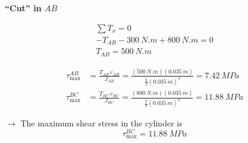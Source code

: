 \documentclass[11pt]{article}
\begin{document}
\bigskip
\noindent
\begin{minipage}[c]{0.55\textwidth}
\textbf{``Cut'' in $AB$}\\[0.3em]
\centering
{}
\end{minipage}%
\hfill
\begin{minipage}[c]{0.42\textwidth}
\begin{gather*}
  \textstyle\sum T_x = 0 \\
  -T_{AB} - \SI{300}{N.m} + \SI{800}{N.m} = 0 \\
  \boxed{T_{AB} = \SI{500}{N.m}}
\end{gather*}
\end{minipage}

\begin{align*}
  \tau_{\max}^{AB} &= \frac{T_{AB}\,c_{AB}}{J_{AB}}
     = \frac{(\SI{500}{N.m})(\SI{0.035}{m})}{\frac{\pi}{2}(\SI{0.035}{m})^4}
     = \SI{7.42}{MPa} \\[4pt]
  \tau_{\max}^{BC} &= \frac{T_{BC}\,c_{BC}}{J_{BC}}
     = \frac{(\SI{800}{N.m})(\SI{0.035}{m})}{\frac{\pi}{2}(\SI{0.035}{m})^4}
     = \SI{11.88}{MPa}
\end{align*}

\noindent
$\rightarrow$ The maximum shear stress in the cylinder is
\[
  \boxed{\tau_{\max}^{BC} = \SI{11.88}{MPa}}
\]
\end{document}
